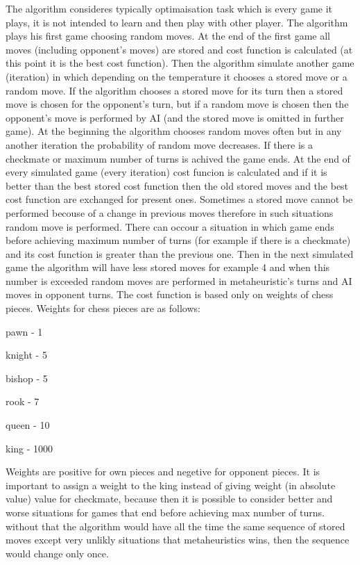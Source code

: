 \documentclass[pdftex]{article}
\begin{document}
The algorithm consideres typically optimaisation task which is every game it plays, it is not intended to learn and then play with other player.
The algorithm plays his first game choosing random moves. At the end of the first game all moves (including opponent's moves) are stored and cost function is calculated (at this point it is the best cost function). Then the algorithm simulate another game (iteration) in which depending on the temperature it chooses a stored move or a random move. If the algorithm chooses a stored move for its turn then a stored move is chosen for the opponent's turn, but if a random move is chosen then the opponent's move is performed by AI (and the stored move is omitted in further game). At the beginning the algorithm chooses random moves often but in any another iteration the probability of random move decreases. If there is a checkmate or maximum number of turns is achived the game ends. At the end of every simulated game (every iteration) cost funcion is calculated and if it is better than the best stored cost function then the old stored moves and the best cost function are exchanged for present ones. Sometimes a stored move cannot be performed becouse of a change in previous moves therefore in such situations random move is performed.
There can occour a situation in which game ends before achieving maximum number of turns (for example if there is a checkmate) and its cost function is greater than the previous one. Then in the next simulated game the algorithm will have less stored moves for example 4 and when this number is exceeded random moves are performed in metaheuristic's turns and AI moves in opponent turns. The cost function is based only on weights of chess pieces. Weights for chess pieces are as follows:

pawn - 1

knight - 5

bishop - 5

rook - 7

queen - 10

king - 1000

Weights are positive for own pieces and negetive for opponent pieces.
It is important to assign a weight to the king instead of giving weight (in absolute value) value for checkmate, because then it is possible to consider better and worse situations for games that end before achieving max number of turns. without that the algorithm would have all the time the same sequence of stored moves except very unlikly situations that metaheuristics wins, then the sequence would change only once.
\end{document}
